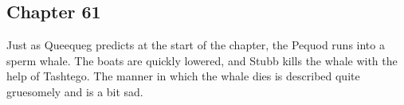\subsection{Chapter 61}

Just as Queequeg predicts at the start of the chapter, the Pequod runs into a
sperm whale. The boats are quickly lowered, and Stubb kills the whale with the
help of Tashtego. The manner in which the whale dies is described quite
gruesomely and is a bit sad.
